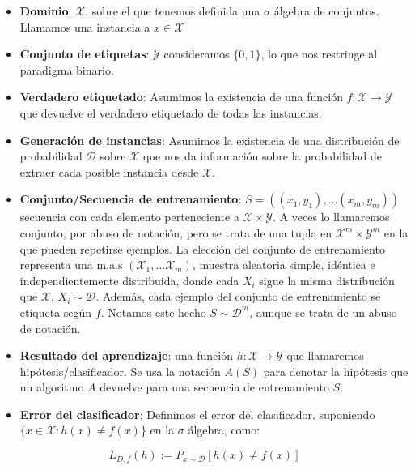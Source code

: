 \begin{itemize}
\item \textbf{Dominio}: $\mathcal{X}$, sobre el que tenemos definida una $\sigma$ álgebra de conjuntos. 
Llamamos una instancia a $x\in \mathcal{X}$
\item \textbf{Conjunto de etiquetas}: $\mathcal{Y}$ consideramos $\{0,1\}$, lo que nos restringe al paradigma binario.
\item \textbf{Verdadero etiquetado}: Asumimos la existencia de una función $f: \mathcal{X} \rightarrow \mathcal{Y}$ que devuelve el verdadero etiquetado de todas las instancias.
\item \textbf{Generación de instancias}: Asumimos la existencia de una distribución de probabilidad $\mathcal{D}$ sobre $\mathcal{X}$ que nos da información sobre la probabilidad de extraer cada posible instancia desde $\mathcal{X}$.
\item \textbf{Conjunto/Secuencia de entrenamiento}: $S = ((x_1,y_1), \ldots (x_m, y_m))$ secuencia con cada elemento perteneciente a $\mathcal{X}\times \mathcal{Y}$. A veces lo llamaremos conjunto, por abuso de notación, pero se trata de una tupla en $\mathcal{X}^m \times \mathcal{Y}^m$ en la que pueden repetirse ejemplos. La elección del conjunto de entrenamiento representa una m.a.s $(\mathcal{X}_1,\ldots \mathcal{X}_m)$, muestra aleatoria simple, idéntica e independientemente distribuida, donde cada $X_i$ sigue la misma distribución que $\mathcal{X}$, $X_i \sim \mathcal{D}$. Además, cada ejemplo del conjunto de entrenamiento se etiqueta según $f$. Notamos este hecho $S \sim \mathcal{D}^m$, aunque se trata de un abuso de notación.
\item \textbf{Resultado del aprendizaje}: una función $h: \mathcal{X} \rightarrow \mathcal{Y}$ que llamaremos hipótesis/clasificador. Se usa la notación $A(S)$ para denotar la hipótesis que un algoritmo $A$ devuelve para una secuencia de entrenamiento $S$.
\item \textbf{Error del clasificador}: Definimos el error del clasificador, suponiendo $\{x\in \mathcal{X} : h(x) \neq f(x)\}$ en la $\sigma$ álgebra, como:
\end{itemize}

\[L_{D,f}(h) :=  P_{x\sim \mathcal{D}} [h(x)\neq f(x)]\]

